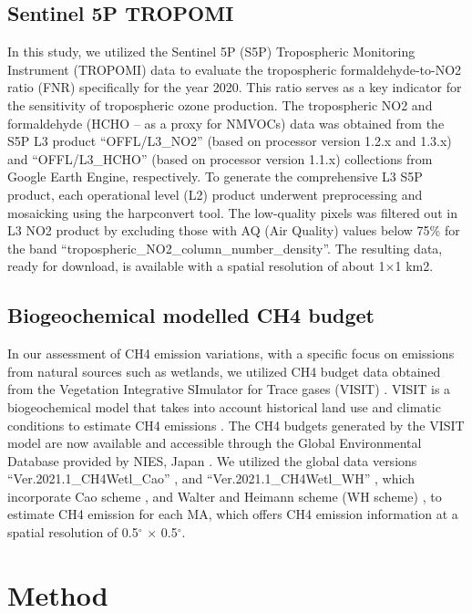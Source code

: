 \subsection{Sentinel 5P TROPOMI}
In this study, we utilized the Sentinel 5P (S5P) Tropospheric Monitoring Instrument (TROPOMI) data to evaluate the tropospheric formaldehyde-to-NO2 ratio (FNR) specifically for the year 2020. This ratio serves as a key indicator for the sensitivity of tropospheric ozone production. The tropospheric NO2 and formaldehyde (HCHO – as a proxy for NMVOCs) data was obtained from the S5P L3 product \enquote{OFFL\slash L3\_NO2} (based on processor version 1.2.x and 1.3.x) and \enquote{OFFL\slash L3\_HCHO} (based on processor version 1.1.x) collections from Google Earth Engine, respectively. To generate the comprehensive L3 S5P product, each operational level (L2) product underwent preprocessing and mosaicking using the harpconvert tool. The low-quality pixels was filtered out in L3 NO2 product by excluding those with AQ (Air Quality) values below 75\% for the band \enquote{tropospheric\_NO2\_column\_number\_density}. The resulting data, ready for download, is available with a spatial resolution of about 1$\times$1 km2.
\subsection{Biogeochemical modelled CH4 budget}
In our assessment of CH4 emission variations, with a specific focus on emissions from natural sources such as wetlands, we utilized CH4 budget data obtained from the Vegetation Integrative SImulator for Trace gases (VISIT) \citep{ito2019methane}. VISIT is a biogeochemical model that takes into account historical land use and climatic conditions to estimate CH4 emissions \citep{ito2019methane}. The CH4 budgets generated by the VISIT model are now available and accessible through the Global Environmental Database provided by NIES, Japan \citep{ito2019methane}. We utilized the global data versions \enquote{Ver.2021.1\_CH4Wetl\_Cao} \citep{ito2021cao}, and \enquote{Ver.2021.1\_CH4Wetl\_WH} \citep{ito2021wh}, which incorporate Cao scheme \citep{cao1996global}, and Walter and Heimann scheme (WH scheme) \citep{walter2000process}, to estimate CH4 emission for each MA, which offers CH4 emission information at a spatial resolution of 0.5$^{\circ}$ $\times$ 0.5$^{\circ}$. \par
\section{Method} \label{chap4_method}
